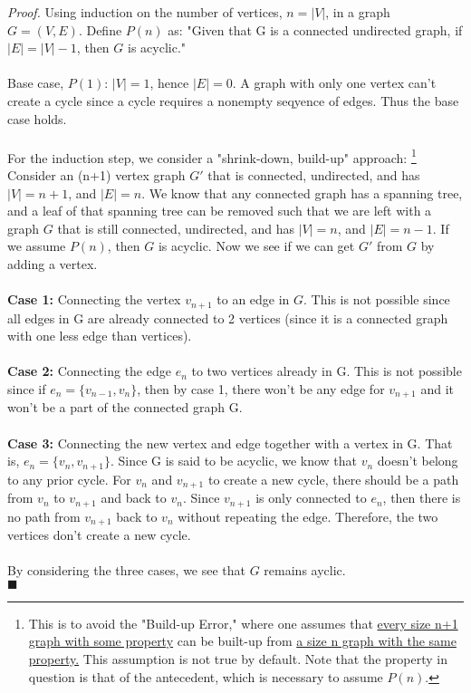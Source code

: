 \documentclass[12pt,twoside]{article}
\begin{document}
\begin{problems}
\textit{Proof.} Using induction on the number of vertices, $n=|V|$, in a graph
  $G=(V,E)$. Define $P(n)$ as: "Given that G is a connected undirected graph, 
  if $|E|=|V|-1$, then $G$ is acyclic." \\
  \\
  Base case, $P(1)$: $|V|=1$, hence $|E|=0$. A graph with only one vertex can't
  create a cycle since a cycle requires a nonempty seqyence of edges. Thus the
  base case holds.\\
  \\
  For the induction step, we consider a "shrink-down, build-up" approach: 
      \footnote{This is to avoid the "Build-up Error," where one assumes
      that \underline{every size n+1 graph with some property} can be built-up 
      from \underline{a size n graph with the same property.} This assumption is 
      not true by default. Note that the property in question is that of 
      the antecedent, which is necessary to assume $P(n)$.}
  Consider an (n+1) vertex graph $G'$ that is connected, undirected, and has
  $|V|=n+1$, and $|E|=n$. We know that any connected graph has a spanning tree,
  and a leaf of that spanning tree can be removed such that we are left with a
  graph $G$ that is still connected, undirected, and has $|V|=n$, and $|E|=n-1$.
  If we assume $P(n)$, then $G$ is acyclic. Now we see if we can get $G'$ from
  $G$ by adding a vertex.\\
  \\
  \textbf{Case 1:} Connecting the vertex $v_{n+1}$ to an edge in $G$. This is
  not possible since all edges in G are already connected to 2 vertices (since
  it is a connected graph with one less edge than vertices).\\
  \\
  \textbf{Case 2:} Connecting the edge $e_n$ to two vertices already in G. This
  is not possible since if $e_n=\{v_{n-1}, v_n\}$, then by case 1, there won't
  be any edge for $v_{n+1}$ and it won't be a part of the connected graph G.\\
  \\
  \textbf{Case 3:} Connecting the new vertex and edge together with a vertex in
  G. That is, $e_n = \{v_n, v_{n+1}\}$. Since G is said to be acyclic, we know
  that $v_n$ doesn't belong to any prior cycle. For $v_n$ and $v_{n+1}$ to
  create a new cycle, there should be a path from $v_n$ to $v_{n+1}$ and back
  to $v_n$. Since $v_{n+1}$ is only connected to $e_{n}$, then there is no path
  from $v_{n+1}$ back to $v_{n}$ without repeating the edge. Therefore, the two
  vertices don't create a new cycle.\\
  \\
  By considering the three cases, we see that $G$ remains ayclic.\\
  \null\hfill $\blacksquare$




\end{problems}
\end{document}
